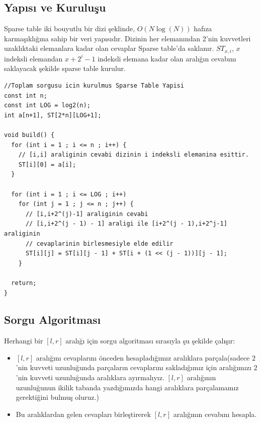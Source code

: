 \documentclass[12pt]{article}
\begin{document}
    \subsection{Yap{\i}s{\i} ve Kurulu\c{s}u}
    
    Sparse table iki bouyutlu bir dizi \c{s}eklinde, $O(N\log(N))$ haf{\i}za karma\c{s}{\i}kl{\i}\u{g}{\i}na sahip bir veri yap{\i}s{\i}d{\i}r. Dizinin her eleman{\i}ndan 2'nin kuvvetleri uzakl{\i}ktaki elemanlara kadar olan cevaplar Sparse table'da saklan{\i}r. $ST_{x,i}$, $x$ indeksli elemandan $x + 2^i - 1$ indeksli elemana kadar olan aral{\i}\u{g}{\i}n cevab{\i}n{\i} saklayacak \c{s}ekilde sparse table kurulur.
    
    \begin{verbatim}
//Toplam sorgusu icin kurulmus Sparse Table Yapisi
const int n;
const int LOG = log2(n);
int a[n+1], ST[2*n][LOG+1];

void build() {
  for (int i = 1 ; i <= n ; i++) {
    // [i,i] araliginin cevabi dizinin i indeksli elemanina esittir.
    ST[i][0] = a[i];
  }

  for (int i = 1 ; i <= LOG ; i++)
    for (int j = 1 ; j <= n ; j++) {
      // [i,i+2^(j)-1] araliginin cevabi
      // [i,i+2^(j - 1) - 1] araligi ile [i+2^(j - 1),i+2^j-1] araliginin
      // cevaplarinin birlesmesiyle elde edilir
      ST[i][j] = ST[i][j - 1] + ST[i + (1 << (j - 1))][j - 1];
    }

  return;
}
    \end{verbatim}
    \cleardoublepage
    
    \subsection{Sorgu Algoritmas{\i}}
    
    Herhangi bir $[l,r]$ aral{\i}\u{g}{\i} i\c{c}in sorgu algoritmas{\i} s{\i}ras{\i}yla \c{s}u \c{s}ekilde \c{c}al{\i}\c{s}{\i}r:
    
    \begin{itemize}
        \item $[l,r]$ aral{\i}\u{g}{\i}n{\i} cevaplar{\i}n{\i} \"{o}nceden hesaplad{\i}\u{g}{\i}m{\i}z aral{\i}klara par\c{c}ala(sadece $2$'nin kuvveti uzunlu\u{g}unda par\c{c}alar{\i}n cevaplar{\i}n{\i} saklad{\i}\u{g}{\i}m{\i}z i\c{c}in aral{\i}\u{g}{\i}m{\i}z{\i} $2$'nin kuvveti uzunlu\u{g}unda aral{\i}klara ay{\i}rmal{\i}y{\i}z. $[l,r]$ aral{\i}\u{g}{\i}n{\i}n uzunlu\u{g}unun ikilik tabanda yazd{\i}\u{g}{\i}m{\i}zda hangi aral{\i}klara par\c{c}alamam{\i}z gerekti\u{g}ini bulmu\c{s} oluruz.) 
        
        \item Bu aral{\i}klardan gelen cevaplar{\i} birle\c{s}tirerek $[l,r]$ aral{\i}\u{g}{\i}n{\i}n cevab{\i}n{\i} hesapla.
        
    \end{itemize}
    
\end{document}
